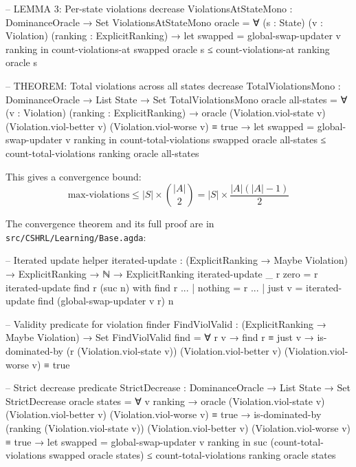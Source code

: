 \documentclass[9pt,a4paper]{article}
\newcommand{\fpath}[1]{\nolinkurl{#1}}
\theoremstyle{plain}
\theoremstyle{definition}
\theoremstyle{remark}
\begin{document}
\begin{code}
  -- LEMMA 3: Per-state violations decrease
  ViolationsAtStateMono : DominanceOracle → Set
  ViolationsAtStateMono oracle = 
    ∀ (s : State) (v : Violation) (ranking : ExplicitRanking) →
    let swapped = global-swap-updater v ranking
    in count-violations-at swapped oracle s ≤ count-violations-at ranking oracle s

  -- THEOREM: Total violations across all states decrease
  TotalViolationsMono : DominanceOracle → List State → Set
  TotalViolationsMono oracle all-states = 
    ∀ (v : Violation) (ranking : ExplicitRanking) →
    oracle (Violation.viol-state v) (Violation.viol-better v) 
           (Violation.viol-worse v) ≡ true →
    let swapped = global-swap-updater v ranking
    in count-total-violations swapped oracle all-states ≤ 
       count-total-violations ranking oracle all-states
\end{code}

This gives a convergence bound:
\[
\text{max-violations} \leq |S| \times \binom{|A|}{2} = |S| \times \frac{|A|(|A|-1)}{2}
\]

The convergence theorem and its full proof are in \fpath{src/CSHRL/Learning/Base.agda}:

\begin{code}[hide]
  -- Iterated update helper
  iterated-update : (ExplicitRanking → Maybe Violation) → 
                    ExplicitRanking → ℕ → ExplicitRanking
  iterated-update _ r zero = r
  iterated-update find r (suc n) with find r
  ... | nothing = r
  ... | just v  = iterated-update find (global-swap-updater v r) n

  -- Validity predicate for violation finder
  FindViolValid : (ExplicitRanking → Maybe Violation) → Set
  FindViolValid find = ∀ r v → find r ≡ just v → 
    is-dominated-by (r (Violation.viol-state v)) 
      (Violation.viol-better v) (Violation.viol-worse v) ≡ true

  -- Strict decrease predicate
  StrictDecrease : DominanceOracle → List State → Set
  StrictDecrease oracle states = ∀ v ranking →
    oracle (Violation.viol-state v) (Violation.viol-better v) 
           (Violation.viol-worse v) ≡ true →
    is-dominated-by (ranking (Violation.viol-state v)) 
      (Violation.viol-better v) (Violation.viol-worse v) ≡ true →
    let swapped = global-swap-updater v ranking
    in suc (count-total-violations swapped oracle states) ≤ 
       count-total-violations ranking oracle states
\end{code}
\end{document}
